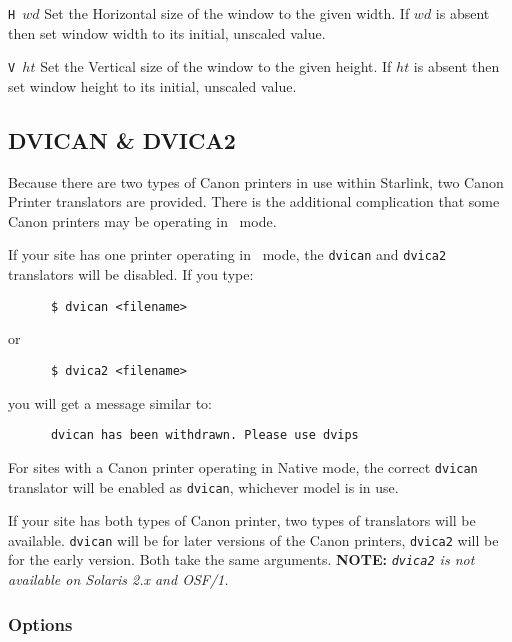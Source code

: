 \begin{list}%
{}%
{\settowidth{\labelwidth}{\tt H $wd$}
\settowidth{\labelsep}{aaaa}
\settowidth{\rightmargin}{aaa}
\addtolength{\labelwidth}{\labelsep}
\setlength{\leftmargin}{\labelwidth}}

\item [\tt H $wd$]
Set the Horizontal size of the window to the given width.
If $wd$ is absent then set window width to its initial, unscaled value.

\item[\tt V $ht$]
Set the Vertical size of the window to the given height.
If $ht$ is absent then set window height to its initial, unscaled value.
\end{list}


\subsection{DVICAN \& DVICA2 }
\label{se:dvidvican}

Because there are two types of Canon printers in use within Starlink, two 
Canon Printer translators are provided. There is the additional complication
that some Canon printers may be operating in \PS\ mode. 

If your site has one printer operating in \PS\ mode, the \verb+dvican+ and
\verb+dvica2+
translators will be disabled. If you type:
\begin{verbatim}
      $ dvican <filename>
\end{verbatim}
or
\begin{verbatim}
      $ dvica2 <filename>
\end{verbatim}
you will get a message similar to:
\begin{verbatim}
      dvican has been withdrawn. Please use dvips 
\end{verbatim}

For sites with a Canon printer operating in Native mode, the correct \verb+dvican+
translator will be enabled as \verb+dvican+, whichever model is in use. 

If your site has both types of Canon printer, two types of translators will be
available. \verb+dvican+ will be for later versions of the Canon  printers,
\verb+dvica2+ will be for the early version. Both take the same arguments. {\bf
NOTE:} {\em \verb+dvica2+ is not available on Solaris 2.x and OSF/1.}

\subsubsection{Options}
\label{se:dvidvicanoptions}

